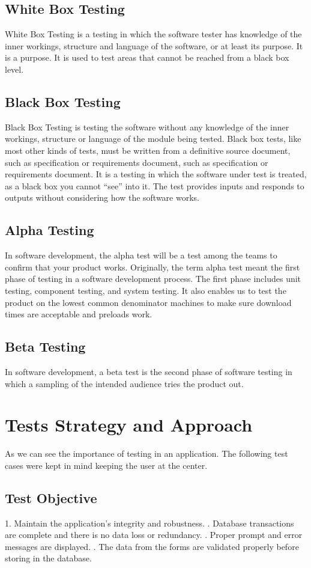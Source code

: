 \documentclass[BTech]{srmuthesis}
\begin{document}
\subsection{White Box Testing}
White Box Testing is a testing in which the software tester has knowledge of the inner workings, structure and language of the software, or at least its purpose. It is a purpose. It is used to test areas that cannot be reached from a black box level.
\subsection{Black Box Testing}
Black Box Testing is testing the software without any knowledge of the inner workings, structure or language of the module being tested. Black box tests, like most other kinds of tests, must be written from a definitive source document, such as specification or requirements document, such as specification or requirements document. It is a testing in which the software under test is treated, as a black box you cannot “see” into it. The test provides inputs and responds to outputs without considering how the software works.
\subsection{Alpha Testing}
In software development, the alpha test will be a test among the teams to confirm that your product works. Originally, the term alpha test meant the first phase of testing in a software development process. The first phase includes unit testing, component testing, and system testing. It also enables us to test the product on the lowest common denominator machines to make sure download times are acceptable and preloads work.
\subsection{Beta Testing}
In software development, a beta test is the second phase of software testing in which a sampling of the intended audience tries the product out.
\section{Tests Strategy and Approach}
As we can see the importance of testing in an application. The following test cases were kept in mind keeping the user at the center.
\subsection{Test Objective}
1. Maintain the application's integrity and robustness.
. Database transactions are complete and there is no data loss or redundancy.
. Proper prompt and error messages are displayed.
. The data from the forms are validated properly before storing in the database.
\end{document}
